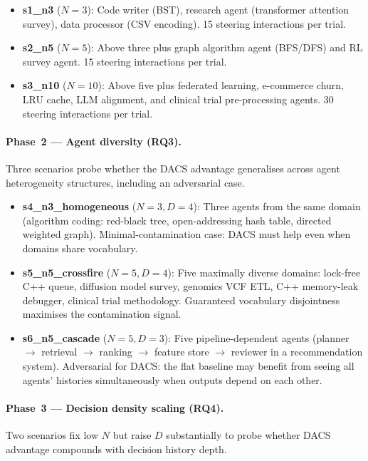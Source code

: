 \documentclass{article}
\begin{document}
\begin{itemize}
  \item \textbf{s1\_n3} ($N=3$): Code writer (BST), research agent
  (transformer attention survey), data processor (CSV encoding).
  15 steering interactions per trial.

  \item \textbf{s2\_n5} ($N=5$): Above three plus graph algorithm agent
  (BFS/DFS) and RL survey agent.
  15 steering interactions per trial.

  \item \textbf{s3\_n10} ($N=10$): Above five plus federated learning,
  e-commerce churn, LRU cache, LLM alignment, and clinical trial
  pre-processing agents.
  30 steering interactions per trial.
\end{itemize}

\paragraph{Phase~2 — Agent diversity (RQ3).}
Three scenarios probe whether the DACS advantage generalises across
agent heterogeneity structures, including an adversarial case.

\begin{itemize}
  \item \textbf{s4\_n3\_homogeneous} ($N=3, D=4$): Three agents from the
  same domain (algorithm coding: red-black tree, open-addressing hash
  table, directed weighted graph).
  Minimal-contamination case: DACS must help even when domains share
  vocabulary.

  \item \textbf{s5\_n5\_crossfire} ($N=5, D=4$): Five maximally diverse
  domains: lock-free C++ queue, diffusion model survey, genomics VCF
  ETL, C++ memory-leak debugger, clinical trial methodology.
  Guaranteed vocabulary disjointness maximises the contamination signal.

  \item \textbf{s6\_n5\_cascade} ($N=5, D=3$): Five pipeline-dependent
  agents (planner $\to$ retrieval $\to$ ranking $\to$ feature store $\to$
  reviewer in a recommendation system).
  Adversarial for DACS: the flat baseline may benefit from seeing all
  agents' histories simultaneously when outputs depend on each other.
\end{itemize}

\paragraph{Phase~3 — Decision density scaling (RQ4).}
Two scenarios fix low $N$ but raise $D$ substantially to probe whether
DACS advantage compounds with decision history depth.
\end{document}
